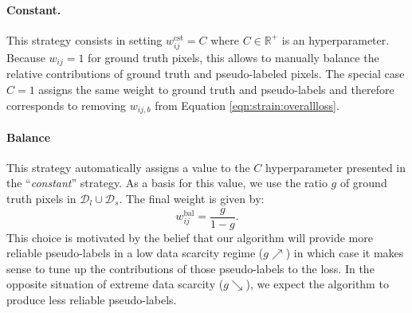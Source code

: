 \paragraph{Constant.} This strategy consists in setting $w^{\text{cst}}_{ij} = C$ where $C \in \mathbb{R}^+$ is an hyperparameter. Because $w_{ij} = 1$ for ground truth pixels, this allows to manually balance the relative contributions of ground truth and pseudo-labeled pixels. The special case $C = 1$ assigns the same weight to ground truth and pseudo-labels and therefore corresponds to removing $w_{ij,b}$ from Equation \ref{eqn:strain:overallloss}.

\paragraph{Balance} This strategy automatically assigns a value to the $C$ hyperparameter presented in the ``\textit{constant}'' strategy. As a basis for this value, we use the ratio $g$ of ground truth pixels in $\mathcal{D}_l \cup \mathcal{D}_s$. The final weight is given by: 
\begin{equation}
w^{\text{bal}}_{ij} = \frac{g}{1 - g}.
\label{eqn:strain:balancegt}
\end{equation}
This choice is motivated by the belief that our algorithm will provide more reliable pseudo-labels in a low data scarcity regime ($g \nearrow $) in which case it makes sense to tune up the contributions of those pseudo-labels to the loss. In the opposite situation of extreme data scarcity ($g \searrow $), we expect the algorithm to produce less reliable pseudo-labels. 

